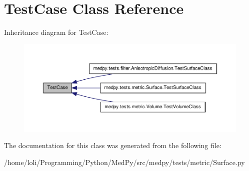 \hypertarget{classunittest_1_1TestCase}{
\section{TestCase Class Reference}
\label{classunittest_1_1TestCase}
}


Inheritance diagram for TestCase:\nopagebreak
\begin{figure}[H]
\begin{center}
\leavevmode
\includegraphics[width=400pt]{classunittest_1_1TestCase__inherit__graph}
\end{center}
\end{figure}


The documentation for this class was generated from the following file:\begin{DoxyCompactItemize}
\item 
/home/loli/Programming/Python/MedPy/src/medpy/tests/metric/Surface.py\end{DoxyCompactItemize}
